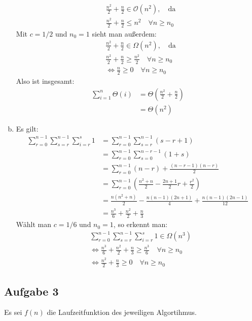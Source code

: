 \documentclass[11pt]{article}
\begin{document}
\begin{enumerate}[(a)]
\begin{align*}
      &\frac{n^2}{2} + \frac{n}{2} \in \mathcal{O}(n^2),\quad\text{da}
      \\ &\frac{n^2}{2} + \frac{n}{2} \leq n^2 \quad\forall n \geq n_0
    \end{align*}
    Mit $c = 1/2$ und $n_0 = 1$ sieht man außerdem:
    \begin{align*}
      &\frac{n^2}{2} + \frac{n}{2} \in \Omega (n^2),\quad\text{da}
      \\ &\frac{n^2}{2} + \frac{n}{2} \geq\frac{n^2}{2}\quad\forall n\geq n_0
      \\ &\Leftrightarrow \frac{n}{2} \geq 0 \quad\forall n \geq n_0
    \end{align*}
    Also ist insgesamt:
    \begin{align*}
      \sum_{i=1}^n \Theta (i) &= \Theta \left(\frac{n^2}{2}+\frac{n}{2}\right)
      \\ &= \Theta (n^2)
    \end{align*}
  \item Es gilt:
    \begin{align*}
      \sum_{r=0}^{n-1} \sum_{s=r}^{n-1} \sum_{i=r}^{s} 1 &= \sum_{r=0}^{n-1}
        \sum_{s=r}^{n-1} (s-r+1)
      \\ &= \sum_{r=0}^{n-1} \sum_{s=0}^{n-r-1} (1+s)
      \\ &= \sum_{r=0}^{n-1} (n-r) + \frac{(n-r-1)(n-r)}{2}
      \\ &= \sum_{r=0}^{n-1} \left(\frac{n^2+n}{2}-\frac{2n+1}{2}r+
        \frac{r^2}{2}\right)
      \\ &= \frac{n(n^2+n)}{2}-\frac{n(n-1)(2n+1)}{4}+\frac{n(n-1)(2n-1)}{12}
      \\ &= \frac{n^3}{6} + \frac{n^2}{2} + \frac{n}{3}
    \end{align*}
     Wählt man $c = 1/6$ und $n_0 = 1$, so erkennt man:
     \begin{align*}
       &\sum_{r=0}^{n-1} \sum_{s=r}^{n-1} \sum_{i=r}^{s} 1 \in \Omega (n^3)
       \\ &\Leftrightarrow \frac{n^3}{6} + \frac{n^2}{2} + \frac{n}{3} \geq
         \frac{n^3}{6} \quad\forall n \geq n_0
       \\&\Leftrightarrow\frac{n^2}{2}+\frac{n}{3}\geq 0\quad\forall n\geq n_0
     \end{align*}
\end{enumerate}

\subsection*{Aufgabe 3}
%
Es sei $f(n)$ die Laufzeitfunktion des jeweiligen Algortihmus.
\end{document}
